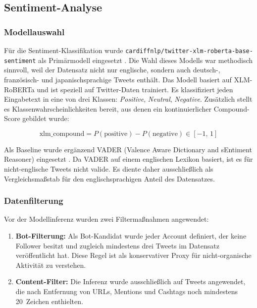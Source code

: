 \subsection{Sentiment-Analyse}
\label{subsec:sentiment}

\subsubsection*{Modellauswahl}

Für die Sentiment-Klassifikation wurde \texttt{cardiffnlp/twitter-xlm-roberta-base-sentiment} als Primärmodell eingesetzt \autocite{loureiro2022timelms}. Die Wahl dieses Modells war methodisch sinnvoll, weil der Datensatz nicht nur englische, sondern auch deutsch-, französisch- und japanischsprachige Tweets enthält. Das Modell basiert auf XLM-RoBERTa \autocite{conneau2020unsupervised} und ist speziell auf Twitter-Daten trainiert. Es klassifiziert jeden Eingabetext in eine von drei Klassen: \textit{Positive}, \textit{Neutral}, \textit{Negative}. Zusätzlich stellt es Klassenwahrscheinlichkeiten bereit, aus denen ein kontinuierlicher Compound-Score gebildet wurde:

\begin{equation}
\text{xlm\_compound} = P(\text{positive}) - P(\text{negative}) \in [-1,\, 1]
\label{eq:compound}
\end{equation}

Als Baseline wurde ergänzend VADER (Valence Aware Dictionary and sEntiment Reasoner) eingesetzt \autocite{hutto2014vader}. Da VADER auf einem englischen Lexikon basiert, ist es für nicht-englische Tweets nicht valide. Es diente daher ausschließlich als Vergleichsmaßstab für den englischsprachigen Anteil des Datensatzes.

\subsubsection*{Datenfilterung}

Vor der Modellinferenz wurden zwei Filtermaßnahmen angewendet:

\begin{enumerate}[noitemsep]
\item \textbf{Bot-Filterung:} Als Bot-Kandidat wurde jeder Account definiert, der keine Follower besitzt und zugleich mindestens drei Tweets im Datensatz veröffentlicht hat. Diese Regel ist als konservativer Proxy für nicht-organische Aktivität zu verstehen.
\item \textbf{Content-Filter:} Die Inferenz wurde ausschließlich auf Tweets angewendet, die nach Entfernung von URLs, Mentions und Cashtags noch mindestens 20~Zeichen enthielten.
\end{enumerate}

